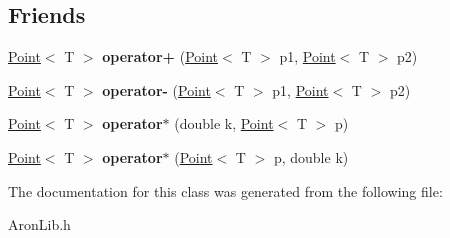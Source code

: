 \subsection*{Friends}
\begin{DoxyCompactItemize}
\item 
\mbox{\label{class_aron_geometry_1_1_point_ab43d6e907fd4ee20a55af8313448af2c}} 
\mbox{\hyperlink{class_aron_geometry_1_1_point}{Point}}$<$ T $>$ {\bfseries operator+} (\mbox{\hyperlink{class_aron_geometry_1_1_point}{Point}}$<$ T $>$ p1, \mbox{\hyperlink{class_aron_geometry_1_1_point}{Point}}$<$ T $>$ p2)
\item 
\mbox{\label{class_aron_geometry_1_1_point_a879c4a6d2de9eb55c1ccf7631c81cec6}} 
\mbox{\hyperlink{class_aron_geometry_1_1_point}{Point}}$<$ T $>$ {\bfseries operator-\/} (\mbox{\hyperlink{class_aron_geometry_1_1_point}{Point}}$<$ T $>$ p1, \mbox{\hyperlink{class_aron_geometry_1_1_point}{Point}}$<$ T $>$ p2)
\item 
\mbox{\label{class_aron_geometry_1_1_point_aa2485a1951c87ed829b6c28ea21502db}} 
\mbox{\hyperlink{class_aron_geometry_1_1_point}{Point}}$<$ T $>$ {\bfseries operator$\ast$} (double k, \mbox{\hyperlink{class_aron_geometry_1_1_point}{Point}}$<$ T $>$ p)
\item 
\mbox{\label{class_aron_geometry_1_1_point_a7ebb94c5729750ad809bd96eece4eba8}} 
\mbox{\hyperlink{class_aron_geometry_1_1_point}{Point}}$<$ T $>$ {\bfseries operator$\ast$} (\mbox{\hyperlink{class_aron_geometry_1_1_point}{Point}}$<$ T $>$ p, double k)
\end{DoxyCompactItemize}


The documentation for this class was generated from the following file\+:\begin{DoxyCompactItemize}
\item 
Aron\+Lib.\+h\end{DoxyCompactItemize}
